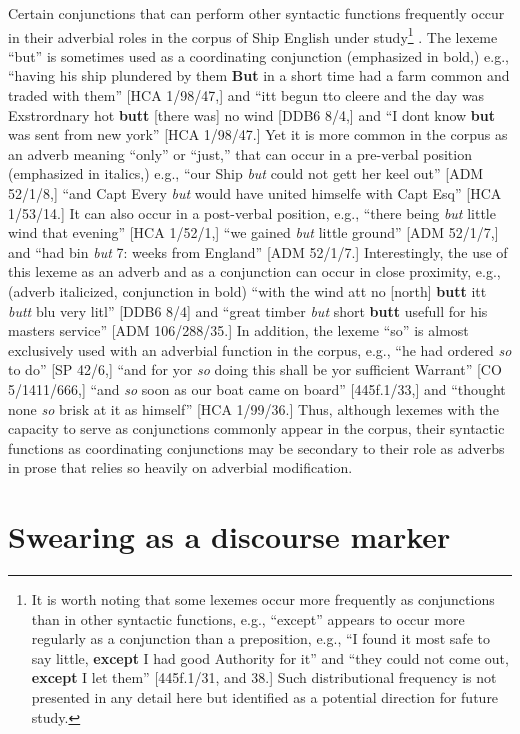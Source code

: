   Certain conjunctions that can perform other syntactic functions frequently occur in their adverbial roles in the corpus of Ship English under study\footnote{It is worth noting that some lexemes occur more frequently as conjunctions than in other syntactic functions, e.g., “except” appears to occur more regularly as a conjunction than a preposition, e.g., “I found it most safe to say little, \textbf{except} I had good Authority for it” and “they could not come out, \textbf{except} I let them” [445f.1/31, and 38.] Such distributional frequency is not presented in any detail here but identified as a potential direction for future study.} . The lexeme “but” is sometimes used as a coordinating conjunction (emphasized in bold,) e.g., “having his ship plundered by them \textbf{But} in a short time had a farm common and traded with them” [HCA 1/98/47,] and “itt begun tto cleere and the day was Exstrordnary hot \textbf{butt} [there was] no wind [DDB6 8/4,] and “I dont know \textbf{but} was sent from new york” [HCA 1/98/47.] Yet it is more common in the corpus as an adverb meaning “only” or “just,” that can occur in a pre-verbal position (emphasized in italics,) e.g., “our Ship \textit{but} could not gett her keel out” [ADM 52/1/8,] “and Capt Every \textit{but} would have united himselfe with Capt Esq” [HCA 1/53/14.] It can also occur in a post-verbal position, e.g., “there being \textit{but} little wind that evening” [HCA 1/52/1,] “we gained \textit{but} little ground” [ADM 52/1/7,] and “had bin \textit{but} 7: weeks from England” [ADM 52/1/7.] Interestingly, the use of this lexeme as an adverb and as a conjunction can occur in close proximity, e.g., (adverb italicized, conjunction in bold) “with the wind att no [north] \textbf{butt} itt \textit{butt} blu very litl” [DDB6 8/4] and “great timber \textit{but} short \textbf{butt} usefull for his masters service” [ADM 106/288/35.] In addition, the lexeme “so” is almost exclusively used with an adverbial function in the corpus, e.g., “he had ordered \textit{so} to do” [SP 42/6,] “and for yor \textit{so} doing this shall be yor sufficient Warrant” [CO 5/1411/666,] “and \textit{so} soon as our boat came on board” [445f.1/33,] and “thought none \textit{so} brisk at it as himself” [HCA 1/99/36.] Thus, although lexemes with the capacity to serve as conjunctions commonly appear in the corpus, their syntactic functions as coordinating conjunctions may be secondary to their role as adverbs in prose that relies so heavily on adverbial modification. 

\section{{Swearing} {as} {a} {discourse} {marker} }%

